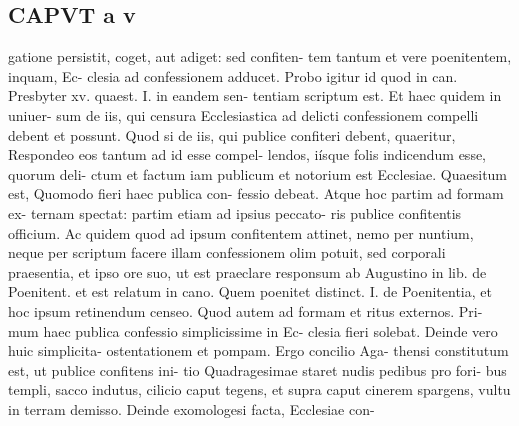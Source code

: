 \documentclass{article}
\begin{document}
\begin{pages}
\section*{CAPVT a v }
\marginpar{[ p.323 ]}gatione persistit, coget, aut adiget: sed confiten- tem tantum et vere poenitentem, inquam, Ec- clesia ad confessionem adducet. Probo igitur id quod in can. Presbyter xv. quaest. I. in eandem sen- tentiam scriptum est. Et haec quidem in uniuer- sum de iis, qui censura Ecclesiastica ad delicti confessionem compelli debent et possunt. Quod si de iis, qui publice confiteri debent, quaeritur, Respondeo eos tantum ad id esse compel- lendos, iísque folis indicendum esse, quorum deli- ctum et factum iam publicum et notorium est Ecclesiae. Quaesitum est, Quomodo fieri haec publica con- fessio debeat. Atque hoc partim ad formam ex- ternam spectat: partim etiam ad ipsius peccato- ris publice confitentis officium. Ac quidem quod ad ipsum confitentem attinet, nemo per nuntium, neque per scriptum facere illam confessionem olim potuit, sed corporali praesentia, et ipso ore suo, ut est praeclare responsum ab Augustino in lib. de Poenitent. et est relatum in cano. Quem poenitet distinct. I. de Poenitentia, et hoc ipsum retinendum censeo. Quod autem ad formam et ritus externos. Pri- mum haec publica confessio simplicissime in Ec- clesia fieri solebat. Deinde vero huic simplicita- ostentationem et pompam. Ergo concilio Aga- thensi constitutum est, ut publice confitens ini- tio Quadragesimae staret nudis pedibus pro fori- bus templi, sacco indutus, cilicio caput tegens, et supra caput cinerem spargens, vultu in terram demisso. Deinde exomologesi facta, Ecclesiae con- 

\end{pages}
\end{document}
